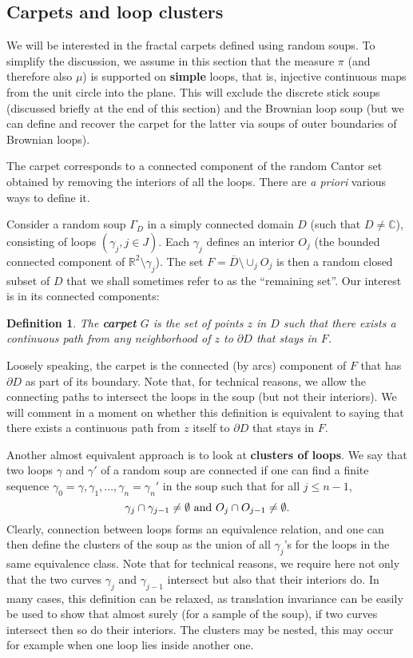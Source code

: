 \documentclass[11pt]{article}
\newcommand{\R}{{{\mathbb {R}}}}
\newtheorem{Definition}{Definition}
\newcommand{\CC}{{\mathbb C}}
\begin{document}
\subsection {Carpets and loop clusters} \label{carpet_cluster}

We will be interested in the fractal carpets defined using random soups. 
To simplify the discussion, we assume in this section that 
the measure $\pi$ (and therefore also $\mu$) is supported on {\bf simple} loops, 
that is, injective continuous maps from the unit circle into the plane. 
This will exclude the discrete stick soups 
(discussed briefly at the end of this section) 
and the Brownian loop soup (but we can define and recover the carpet for the latter
via soups of outer boundaries of Brownian loops).

The carpet corresponds to a connected component of the random Cantor set 
obtained by removing the interiors of all the loops. 
There are {\it a priori} various ways to define it. 

Consider a random soup $\Gamma_D$ in a simply connected domain $D$ (such that $D \not= \CC$),
consisting of loops $(\gamma_j, j \in J)$.
Each $\gamma_j$ defines an interior $O_j$ 
(the bounded connected component of $\R^2 \setminus \gamma_j$). 
The set $F={\overline D} \setminus \cup_j O_j$ is then a random closed subset of $D$ that we shall
sometimes refer to as the ``remaining set''. Our interest is in its connected components:

\begin{Definition}
The {\bf carpet} $G$ is the set of points $z$ in $D$ such that there exists 
a continuous path from any neighborhood of $z$ to $\partial D$ that stays in $F$. 
\end{Definition}

Loosely speaking, the carpet is the connected (by arcs) component of 
$F$ that has $\partial D$ as part of its boundary. Note that, for technical
reasons, we allow the connecting paths to intersect the loops in the soup
(but not their interiors). We will comment in a moment on whether this definition is equivalent to 
saying that there exists a continuous path from $z$ itself to $\partial D$ that stays in $F$.

\medbreak
Another almost equivalent approach is to look at {\bf clusters of loops}.
We say that two loops $\gamma$ and $\gamma'$ of a random soup are connected 
if one can find a finite sequence 
$\gamma_0= \gamma, \gamma_1, \ldots , \gamma_n = \gamma_n'$ 
in the soup such that for all $j \le n-1$, 
$$ \gamma_j \cap \gamma_{j-1} \not= \emptyset \hbox { and } O_j \cap O_{j-1} \not= \emptyset.$$
Clearly, connection between loops forms an equivalence relation, and
one can then define the clusters of the soup as the union of all $\gamma_j$'s 
for the loops in the same equivalence class. Note that for technical reasons,
we require here not only that 
the two curves $\gamma_j$ and $\gamma_{j-1}$ intersect but also that their interiors do. 
In many cases, this definition can be relaxed, as translation invariance 
can be easily be used to show that almost surely (for a sample of the soup), 
if two curves intersect then so do their interiors.
The clusters may be nested, this may occur for example when one loop lies
inside another one.
\end{document}
